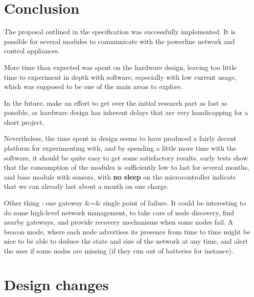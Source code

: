 
\section{Conclusion}


The proposal outlined in the specification was successfully implemented. It is
possible for several modules to communicate with the powerline network and
control appliances. 

More time than expected was spent on the hardware design, leaving too little
time to experiment in depth with software, especially with low current usage,
which was supposed to be one of the main areas to explore. 

In the future, make an effort to get over the initial research part as fast as
possible, as hardware design has inherent delays that are very handicapping for
a short project.

Nevertheless, the time spent in design seems to have produced a fairly decent
platform for experimenting with, and by spending a little more time with the
software, it should be quite easy to get some satisfactory results. \rightarrow
early tests show that the consumption of the modules is sufficiently low to last
for several months, and base module with sensors, with \textbf{no sleep} on the
microcontroller indicate that we can already last about a month on one charge. 

Other thing : one gateway &=& single point of failure. It could be interesting
to do some high-level network management, to take care of node discovery, find
nearby gateways, and provide recovery mechanisms when some nodes fail. A beacon
mode, where each node advertises its presence from time to time might be nice to
be able to deduce the state and size of the network at any time, and alert the
user if some nodes are missing (if they run out of batteries for instance).

\pagebreak



\pagebreak
\appendix

\section{Design changes}
\label{sec:design-changes}

